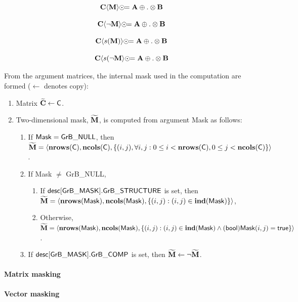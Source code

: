$$
{\bf C} \langle {\bf M} \rangle \odot\!\!= {\bf A} \oplus.\otimes {\bf B}
$$

$$
{\bf C} \langle \neg{{\bf M}} \rangle \odot\!\!= {\bf A} \oplus.\otimes {\bf B}
$$

$$
{\bf C} \langle s({\bf M}) \rangle \odot\!\!= {\bf A} \oplus.\otimes {\bf B}
$$

$$
{\bf C} \langle s(\neg{{\bf M}} \rangle \odot\!\!= {\bf A} \oplus.\otimes {\bf B}
$$


From the argument matrices, the internal mask used in 
the computation are formed ($\leftarrow$ denotes copy):
\begin{enumerate}
	\item Matrix ${\bf \widetilde{C}} \leftarrow {\sf C}$.

	\item Two-dimensional mask, ${\bf \widetilde{M}}$, is computed from
    argument {\sf Mask} as follows:
	\begin{enumerate}
		\item If ${\sf Mask} = {\sf GrB\_NULL}$, then ${\bf \widetilde{M}} = 
        \langle \bold{nrows}({\sf C}), \bold{ncols}({\sf C}), \{(i,j), 
        \forall i,j : 0 \leq i <  \bold{nrows}({\sf C}), 0 \leq j < 
        \bold{ncols}({\sf C}) \} \rangle$.

		\item If {\sf Mask} $\ne$ {\sf GrB\_NULL},
        \begin{enumerate}
            \item If ${\sf desc[GrB\_MASK].GrB\_STRUCTURE}$ is set, then 
            ${\bf \widetilde{M}} = \langle \bold{nrows}({\sf Mask}), 
            \bold{ncols}({\sf Mask}), \{(i,j) : (i,j) \in \bold{ind}({\sf Mask}) \} \rangle$,
            \item Otherwise, ${\bf \widetilde{M}} = \langle \bold{nrows}({\sf Mask}), 
            \bold{ncols}({\sf Mask}), \\ \{(i,j) : (i,j) \in \bold{ind}({\sf Mask}) \wedge 
            ({\sf bool}){\sf Mask}(i,j) = {\sf true}\} \rangle$.
        \end{enumerate}

		\item	If ${\sf desc[GrB\_MASK].GrB\_COMP}$ is set, then 
        ${\bf \widetilde{M}} \leftarrow \neg {\bf \widetilde{M}}$.
	\end{enumerate}
\end{enumerate}

\paragraph{Matrix masking}




\paragraph{Vector masking}


